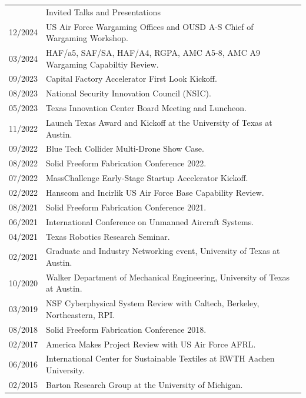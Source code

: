 \documentclass[letterpaper, 11pt]{article}
\newcommand{\headingfont}{\Large\color{CustomBlue}}
\newenvironment{SectionTable}[1]{
	\renewcommand*{\arraystretch}{1.3} %
	\setlength{\tabcolsep}{10pt}
	\begin{longtable}{Rp{4.9in}} & #1 \\}
{\end{longtable}}
\begin{document}
\begin{SectionTable}{\headingfont Invited Talks and Presentations}
12/2024 & US Air Force Wargaming Offices and OUSD A-S Chief of Wargaming Workshop. \\

03/2024 & HAF/a5, SAF/SA, HAF/A4, RGPA, AMC A5-8, AMC A9 Wargaming Capabiltiy Review. \\

09/2023 & Capital Factory Accelerator First Look Kickoff. \\

08/2023 & National Security Innovation Council (NSIC). \\

05/2023 & Texas Innovation Center Board Meeting and Luncheon. \\

11/2022 & Launch Texas Award and Kickoff at the University of Texas at Austin. \\

09/2022 & Blue Tech Collider Multi-Drone Show Case. \\

08/2022 & Solid Freeform Fabrication Conference 2022. \\

07/2022 & MassChallenge Early-Stage Startup Accelerator Kickoff. \\

02/2022 & Hanscom and Incirlik US Air Force Base Capability Review. \\

08/2021 & Solid Freeform Fabrication Conference 2021. \\

06/2021 & International Conference on Unmanned Aircraft Systems. \\

04/2021 & Texas Robotics Research Seminar. \\

02/2021 & Graduate and Industry Networking event, University of Texas at Austin. \\

10/2020 & Walker Department of Mechanical Engineering, University of Texas at Austin. \\

03/2019 & NSF Cyberphysical System Review with Caltech, Berkeley, Northeastern, RPI. \\

08/2018 & Solid Freeform Fabrication Conference 2018. \\

02/2017 & America Makes Project Review with US Air Force AFRL. \\

06/2016 & International Center for Sustainable Textiles at RWTH Aachen University. \\

02/2015 & Barton Research Group at the University of Michigan. \\

\end{SectionTable}


\end{document}
